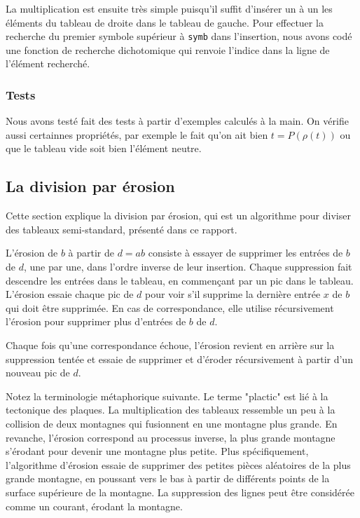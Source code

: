 La multiplication est ensuite très simple puisqu'il suffit d'insérer un à un les éléments du tableau de droite dans le tableau de gauche. Pour effectuer la recherche du premier symbole supérieur à \texttt{symb} dans l'insertion, nous avons codé une fonction de recherche dichotomique qui renvoie l'indice dans la ligne de l'élément recherché.

\subsubsection{Tests}
Nous avons testé fait des tests à partir d'exemples calculés à la main. On vérifie aussi certainnes propriétés, par exemple le fait qu'on ait bien $t=P(\rho(t))$ ou que le tableau vide soit bien l'élément neutre.

\subsection{La division par érosion}
Cette section explique la division par érosion, qui est un algorithme pour diviser des tableaux semi-standard, présenté dans ce rapport.

L'érosion de $b$ à partir de $d = ab$ consiste à essayer de supprimer les entrées de $b$ de $d$, une par une, dans l'ordre inverse de leur insertion. Chaque suppression fait descendre les entrées dans le tableau, en commençant par un pic dans le tableau. L'érosion essaie chaque pic de $d$ pour voir s'il supprime la dernière entrée $x$ de $b$ qui doit être supprimée. En cas de correspondance, elle utilise récursivement l'érosion pour supprimer plus d'entrées de $b$ de $d$.

Chaque fois qu'une correspondance échoue, l'érosion revient en arrière sur la suppression tentée et essaie de supprimer et d'éroder récursivement à partir d'un nouveau pic de $d$.

Notez la terminologie métaphorique suivante.
Le terme "plactic" est lié à la tectonique des plaques. 
La multiplication des tableaux ressemble un peu à la collision de deux montagnes qui fusionnent en une montagne plus grande. En revanche, l'érosion correspond au processus inverse, la plus grande montagne s'érodant pour devenir une montagne plus petite. Plus spécifiquement, l'algorithme d'érosion essaie de supprimer des petites pièces aléatoires de la plus grande montagne, en poussant vers le bas à partir de différents points de la surface supérieure de la montagne. 
La suppression des lignes peut être considérée comme un courant, érodant la montagne.


